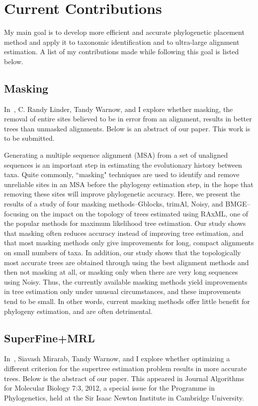 \documentclass[times, 10pt]{article}
\begin{document}

\section{Current Contributions}
My main goal is to develop more efficient and accurate phylogenetic placement method and apply it to taxonomic identification and to ultra-large alignment estimation.  A list of my contributions made while following this goal is listed below.

\subsection{Masking}
In~\cite{nguyen2012masking}, C. Randy Linder, Tandy Warnow, and I explore whether masking, the removal of entire sites believed to be in error from an alignment, results in better trees than unmasked alignments.  Below is an abstract of our paper.  This work is to be submitted.

Generating a multiple sequence alignment (MSA) from a set of unaligned sequences is an important step in estimating the evolutionary history between taxa.  Quite commonly, ``masking" techniques are used to identify and remove unreliable sites in an MSA before the phylogeny estimation step, in the hope that removing these sites will improve phylogenetic accuracy. Here, we present the results of a study of four masking methods--Gblocks, trimAl, Noisy, and BMGE--focusing  on   the impact  on the topology  of trees estimated using RAxML, one of the popular methods for maximum likelihood tree estimation. Our study shows that masking  often reduces accuracy instead of improving tree estimation, and that most masking methods only give improvements for long, compact alignments on small numbers of taxa.  In addition, our study shows that the topologically most accurate trees are obtained through using the best alignment methods and then not masking at all, or masking only when there are very long sequences using Noisy. Thus, the currently available masking methods yield improvements in tree estimation only under unusual circumstances, and these improvements tend to be small. In other words, current masking methods offer little benefit for phylogeny estimation, and are often detrimental.

\subsection{SuperFine+MRL}
In~\cite{Nguyen2012}, Siavash Mirarab, Tandy Warnow, and I explore whether optimizing a different criterion for the supertree estimation problem results in more accurate trees.  Below is the abstract of our paper.  This appeared in Journal Algorithms for Molecular Biology 7:3, 2012, a special issue for the Programme in Phylogenetics, held at the Sir Isaac Newton Institute in Cambridge University.
\end{document}
